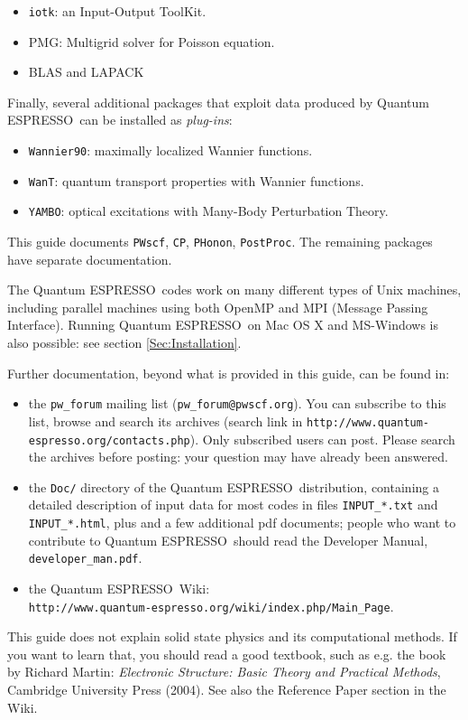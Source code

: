 \documentclass[12pt,a4paper]{article}
\def\qe{{\sc Quantum ESPRESSO}}
\def\PWscf{\texttt{PWscf}}
\def\PHonon{\texttt{PHonon}}
\def\CP{\texttt{CP}}
\def\PostProc{\texttt{PostProc}}
\begin{document}
\begin{itemize}
\item \texttt{iotk}:
      an Input-Output ToolKit.
\item PMG:
      Multigrid solver for Poisson equation.
\item BLAS and LAPACK
\end{itemize}
Finally, several additional packages that exploit data produced by \qe\ 
can be installed as {\em plug-ins}:
\begin{itemize}
\item \texttt{Wannier90}:
      maximally localized Wannier functions.
\item \texttt{WanT}:
      quantum transport properties with Wannier functions.
\item \texttt{YAMBO}:
      optical excitations with Many-Body Perturbation Theory.
\end{itemize}
This guide documents \PWscf, \CP, \PHonon, \PostProc.
The remaining packages have separate documentation.

The \qe\ codes work on many different types of Unix machines,
including parallel machines using both OpenMP and MPI 
(Message Passing Interface).
Running \qe\ on Mac OS X and MS-Windows is also possible: 
see section \ref{Sec:Installation}.

Further documentation, beyond what is provided in this guide, can be found in:
\begin{itemize}
\item the \texttt{pw\_forum} mailing list (\texttt{pw\_forum@pwscf.org}).
   You can subscribe to this list, browse and search its archives
   (search link in \texttt{http://www.quantum-espresso.org/contacts.php}).
   Only subscribed users can post. Please search the archives 
   before posting: your question may have already been answered.
  \item the \texttt{Doc/} directory of the \qe\ distribution,
   containing a detailed description of input data for most codes
   in files \texttt{INPUT\_*.txt} and \texttt{INPUT\_*.html},
   plus and a few additional pdf documents; people who want to contribute
   to \qe\ should read the Developer Manual, \texttt{developer\_man.pdf}.
  \item the \qe\ Wiki:\\
   \texttt{http://www.quantum-espresso.org/wiki/index.php/Main\_Page}.
\end{itemize}

This guide does not explain solid state physics and its computational methods.
If you want to learn that, you should read a good textbook, such as e.g.
the book by Richard Martin:
{\em Electronic Structure: Basic Theory and Practical Methods},
Cambridge University Press (2004). See also the Reference Paper 
section in the Wiki.
\end{document}
